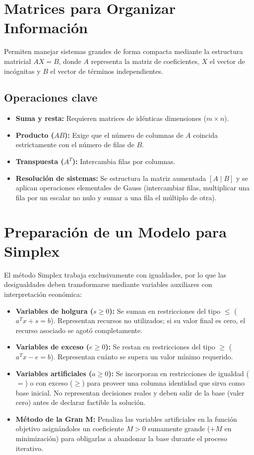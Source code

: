 \documentclass[11pt, a4paper]{article}
\begin{document}
\section{Matrices para Organizar Información}

Permiten manejar sistemas grandes de forma compacta mediante la estructura matricial $AX = B$, donde $A$ representa la matriz de coeficientes, $X$ el vector de incógnitas y $B$ el vector de términos independientes.

\subsection*{Operaciones clave}
\begin{itemize}
    \item \textbf{Suma y resta:} Requieren matrices de idénticas dimensiones ($m \times n$).
    \item \textbf{Producto ($AB$):} Exige que el número de columnas de $A$ coincida estrictamente con el número de filas de $B$.
    \item \textbf{Transpuesta ($A^T$):} Intercambia filas por columnas.
    \item \textbf{Resolución de sistemas:} Se estructura la matriz aumentada $[A \mid B]$ y se aplican operaciones elementales de Gauss (intercambiar filas, multiplicar una fila por un escalar no nulo y sumar a una fila el múltiplo de otra).
\end{itemize}

\section{Preparación de un Modelo para Simplex}

El método Simplex trabaja exclusivamente con igualdades, por lo que las desigualdades deben transformarse mediante variables auxiliares con interpretación económica:

\begin{itemize}
    \item \textbf{Variables de holgura ($s \ge 0$):} Se suman en restricciones del tipo $\le$ ($a^T x + s = b$). Representan recursos no utilizados; si su valor final es cero, el recurso asociado se agotó completamente.
    \item \textbf{Variables de exceso ($e \ge 0$):} Se restan en restricciones del tipo $\ge$ ($a^T x - e = b$). Representan cuánto se supera un valor mínimo requerido.
    \item \textbf{Variables artificiales ($a \ge 0$):} Se incorporan en restricciones de igualdad ($=$) o con exceso ($\ge$) para proveer una columna identidad que sirva como base inicial. No representan decisiones reales y deben salir de la base (valer cero) antes de declarar factible la solución.
    \item \textbf{Método de la Gran M:} Penaliza las variables artificiales en la función objetivo asignándoles un coeficiente $M > 0$ sumamente grande ($+M$ en minimización) para obligarlas a abandonar la base durante el proceso iterativo.
\end{itemize}
\end{document}
